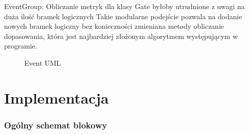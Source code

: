 EventGroup:
Obliczanie metryk dla klasy Gate byłoby utrudnione z uwagi na duża ilość bramek logicznych 
Takie modularne podejście pozwala na dodanie nowych bramek logiczny bez konieczności zmieniana metody obliczanie dopasowania, która jest najbardziej złożonym algorytmem występującym w programie. 
\begin{figure}[h]
	\caption{\label{fig:subcaption_example}Event UML}
\end{figure}

\clearpage
\section{Implementacja}

\subsubsection{Ogólny schemat blokowy}


